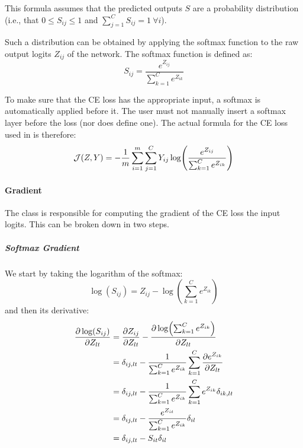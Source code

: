 This formula assumes that the predicted outputs $S$ are a probability distribution (i.e., that $0 \leq S_{ij} \leq 1$ and $\sum_{j=1}^{C} S_{ij} = 1\ \forall i$).

Such a distribution can be obtained by applying the softmax function to the raw output logits $Z_{ij}$ of the network. The softmax function is defined as:
\begin{equation}
    S_{ij} = \frac{e^{Z_{ij}}}{\sum_{k=1}^{C} e^{Z_{ik}}}
\end{equation}

To make sure that the \ac{CE} loss has the appropriate input, a softmax is automatically applied before it. The user must not manually insert a softmax layer before the loss (nor does \mfnet define one). The actual formula for the \ac{CE} loss used in \mfnet is therefore:
\begin{equation}
    \mathcal{J}(Z, Y) = -\frac{1}{m} \sum_{i=1}^{m} \sum_{j=1}^{C} Y_{ij} \log(\frac{e^{Z_{ij}}}{\sum_{k=1}^{C} e^{Z_{ik}}})
\end{equation}

\paragraph{Gradient} The  class is responsible for computing the gradient of the \ac{CE} loss \wrt the input logits. This can be broken down in two steps.

\subparagraph{Softmax Gradient} We start by taking the logarithm of the softmax:
\begin{equation*}
    \log(S_{ij}) = Z_{ij} - \log(\sum_{k=1}^{C} e^{Z_{ik}})
\end{equation*}
and then its derivative:
\begin{equation} \label{eq:softmax_grad}
\begin{split}
    \pdv{\log(S_{ij})}{Z_{lt}} &= \pdv{Z_{ij}}{Z_{lt}} - \pdv{\log(\sum_{k=1}^{C} e^{Z_{ik}})}{Z_{lt}}\\
    &= \delta_{ij,lt} - \frac{1}{\sum_{k=1}^{C} e^{Z_{ik}}} \sum_{k=1}^{C} \pdv{e^{Z_{ik}}}{Z_{lt}}\\
    &= \delta_{ij,lt} - \frac{1}{\sum_{k=1}^{C} e^{Z_{ik}}} \sum_{k=1}^{C} e^{Z_{ik}} \delta_{ik,lt}\\
    &= \delta_{ij,lt} - \frac{e^{Z_{it}}}{\sum_{k=1}^{C} e^{Z_{ik}}} \delta_{il}\\
    &= \delta_{ij,lt} - S_{it} \delta_{il}
\end{split}
\end{equation}

